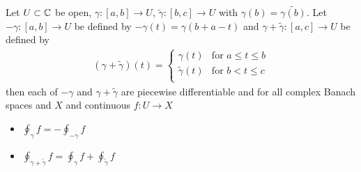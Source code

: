 \begin{prop}\label{banach:ContourIntegralOperations}Let $U \subset \mathbb{C}$ be open, $\gamma : [a,b] \to U$, $\tilde{\gamma} : [b, c] \to U$ with $\gamma(b) = \tilde{\gamma(b)}$.   Let $-\gamma : [a,b] \to U$ be defined by $-\gamma(t) = \gamma(b+a-t)$ and $\gamma + \tilde{\gamma} : [a,c] \to U$ be defined by
\begin{align*}
\left(\gamma + \tilde{\gamma}  \right)(t) = \begin{cases}
\gamma(t) & \text{for $a \leq t \leq b$} \\
\tilde{\gamma}(t) & \text{for $b < t \leq c$} \\
\end{cases}
\end{align*}
then each of $-\gamma$ and $\gamma + \tilde{\gamma}$ are piecewise differentiable and for all complex Banach spaces and $X$ and continuous $f : U \to X$
\begin{itemize}
\item[(i)] $\oint_{\gamma} f = - \oint_{-\gamma} f$
\item[(ii)] $\oint_{\gamma + \tilde{\gamma}} f = \oint_{\gamma} f + \oint_{\tilde{\gamma}} f$
\end{itemize}
\end{prop}
